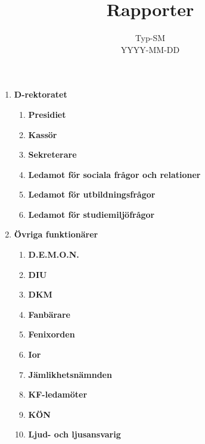 \documentclass[a4paper]{article}
\title{Rapporter}
\date{Typ-SM\\YYYY-MM-DD} %
\begin{document}
\maketitle

\pagestyle{empty}
\thispagestyle{empty}

\begin{enumerate}
\item \textbf{D-rektoratet}
  \begin{enumerate}
    \item \textbf{Presidiet}

    \item \textbf{Kassör}

    \item \textbf{Sekreterare}

    \item \textbf{Ledamot för sociala frågor och relationer}

    \item \textbf{Ledamot för utbildningsfrågor}

    \item \textbf{Ledamot för studiemiljöfrågor}

  \end{enumerate}

\item \textbf{Övriga funktionärer}

  \begin{enumerate}

    \item \textbf{D.E.M.O.N.}

    \item \textbf{DIU}

    \item \textbf{DKM}

    \item \textbf{Fanbärare}

    \item \textbf{Fenixorden}

    \item \textbf{Ior}

    \item \textbf{Jämlikhetsnämnden}

    \item \textbf{KF-ledamöter}

    \item \textbf{KÖN}

    \item \textbf{Ljud- och ljusansvarig}


\end{enumerate}
\end{enumerate}
\end{document}
